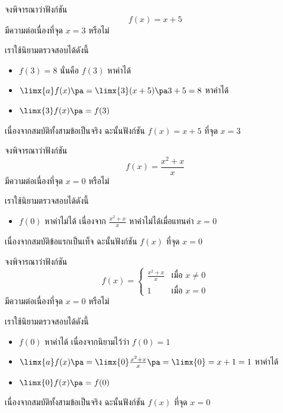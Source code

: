 \begin{frame}[t]
\begin{ex}
จงพิจารณาว่าฟังก์ชัน 
\[f(x) = x+5\]
มีความต่อเนื่องที่จุด $x = 3$ หรือไม่
\end{ex}
\begin{sol}
เราใช้นิยามตรวจสอบได้ดังนี้ \pa
\begin{itemize}
\item $f(3) = 8$ \pa นั่นคือ $f(3)$ หาค่าได้ \pa
\item $\limx{a} f(x) \pa = \limx{3} (x+5) \pa  3+5 = 8$ \pa หาค่าได้
\item $\limx{3} f(x) \pa = f(3)$ 
\end{itemize}
เนื่องจากสมบัติทั้งสามข้อเป็นจริง \pa ฉะนั้นฟังก์ชัน $f(x) = x+5$  ที่จุด $x = 3$
\end{sol}
\end{frame}


\begin{frame}[t]
\begin{ex}
จงพิจารณาว่าฟังก์ชัน 
\[f(x) = \frac{x^2+x}{x}\]
มีความต่อเนื่องที่จุด $x = 0$ หรือไม่
\end{ex}
\begin{sol}
เราใช้นิยามตรวจสอบได้ดังนี้ \pa
\begin{itemize}
\item $f(0)$ หาค่าไม่ได้ \pa เนื่องจาก $\frac{x^2+x}{x}$ หาค่าไม่ได้เมื่อแทนค่า $x=0$ \pa
\end{itemize}
เนื่องจากสมบัติข้อแรกเป็นเท็จ \pa ฉะนั้นฟังก์ชัน $f(x)$  ที่จุด $x = 0$
\end{sol}
\end{frame}


\begin{frame}[t]
\begin{ex}
จงพิจารณาว่าฟังก์ชัน 
\[f(x) = \begin{cases} \frac{x^2+x}{x} &\mbox{เมื่อ } x \neq 0 \\ 1 &\mbox{เมื่อ } x = 0\end{cases}\]
มีความต่อเนื่องที่จุด $x = 0$ หรือไม่
\end{ex}
\begin{sol}
เราใช้นิยามตรวจสอบได้ดังนี้ \pa
\begin{itemize}
\item $f(0)$ หาค่าได้ \pa เนื่องจากนิยามไว้ว่า $f(0) = 1$ \pa
\item $\limx{a} f(x) \pa = \limx{0} \frac{x^2+x}{x} \pa=  \limx{0} = x+1 = 1$ \pa หาค่าได้ \pa
\item $\limx{0} f(x) \pa = f(0)$ 
\end{itemize}
เนื่องจากสมบัติทั้งสามข้อเป็นจริง \pa ฉะนั้นฟังก์ชัน  $f(x)$  ที่จุด $x = 0$
\end{sol}
\end{frame}

